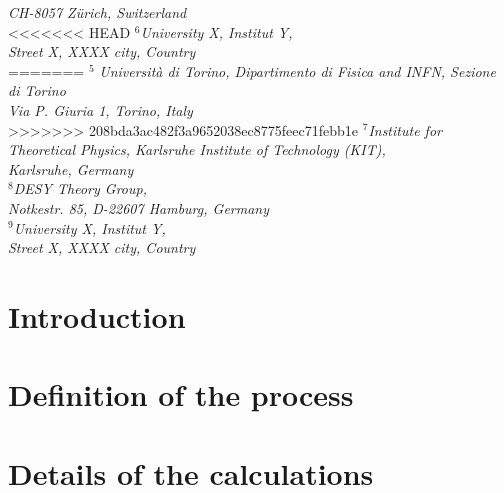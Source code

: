 \documentclass[11pt,epsf]{article}
\begin{document}
{{\small\it CH-8057
Z\"urich, Switzerland}\\[3mm]
<<<<<<< HEAD
{\small\it
$^6$University X, %
        Institut Y,} \\ %
{\small\it Street X, \linebreak %
        XXXX city, %
        Country}\\[3mm]
=======
$^5${\small\it
Universit\`a di Torino, Dipartimento di Fisica and INFN, Sezione di Torino } \\ %
{\small\it Via P. Giuria 1,  Torino, %
        Italy}\\[3mm]
>>>>>>> 208bda3ac482f3a9652038ec8775feec71febb1e
{\small\it
$^7$Institute for Theoretical Physics, Karlsruhe Institute of
Technology (KIT),} \\ %
{\small\it Karlsruhe, Germany}\\[3mm]
{\small\it
$^8$DESY Theory Group,} \\ %
{\small\it Notkestr. 85, \linebreak %
        D-22607 Hamburg, Germany}\\[3mm]
{\small\it
$^9$University X, %
        Institut Y,} \\ %
{\small\it Street X, \linebreak %
        XXXX city, %
        Country}\\[3mm]
        }


\maketitle

\newpage



\section{Introduction}



\section{Definition of the process}

\section{Details of the calculations}
\end{document}
